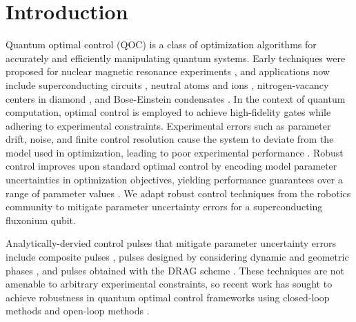 \section{Introduction}
Quantum optimal control (QOC) is a class of optimization
algorithms for accurately and efficiently manipulating quantum systems.
Early techniques were proposed for nuclear magnetic resonance experiments
\cite{vandersypen2005nmr, kehlet2004improving, khaneja2005optimal,
  maximov2008optimal, nielsen2010optimal, skinner2003application, tosner2009optimal},
and applications now include superconducting circuits \cite{abdelhafez2020universal,
  chakram2020multimode, fisher2010optimal, gokhale2019partial,
  leng2019robust, leung2017speedup, li2020fast},
neutral atoms and ions \cite{brouzos2015quantum,
  de2008optimal, goerz2011quantum, guo2019high, jensen2019time,
  larrouy2020fast, omran2019generation, rosi2013fast, sorensen2019qengine,
  treutlein2006microwave, van2016optimal},
nitrogen-vacancy centers in diamond \cite{chou2015optimal,
  dolde2014high, geng2016experimental,
  nobauer2015smooth, poggiali2018optimal, rembold2020introduction, tian2019optimal},
and Bose-Einstein condensates \cite{amri2019optimal, sorensen2018quantum}.
In the context of quantum computation,
optimal control is employed to achieve high-fidelity gates
while adhering to experimental constraints.
Experimental errors such as parameter drift, noise, and
finite control resolution cause the system to deviate
from the model used in optimization, leading
to poor experimental performance
.
Robust control improves upon
standard optimal control by encoding
model parameter uncertainties
in optimization objectives, yielding performance
guarantees over a range of parameter values \cite{Zhou97,Morimoto00,Manchester18}.
We adapt robust control techniques from the robotics community to mitigate
parameter uncertainty errors for
a superconducting fluxonium qubit.

Analytically-dervied control pulses that mitigate parameter uncertainty
errors include composite pulses \cite{cummins2000use, cummins2003tackling,
  kupce1995stretched, merrill2014progress},
pulses designed by considering dynamic and geometric phases
\cite{han2020experimental, xu2020nonadiabatic}, and
pulses obtained with the DRAG scheme \cite{motzoi2009simple}.
These techniques are not amenable to arbitrary experimental constraints,
so recent work has sought to achieve robustness in quantum optimal
control frameworks using closed-loop methods \cite{egger2014adaptive, feng2018gradient,
  li2017hybrid, wittler2020integrated} and open-loop methods \cite{
  allen2019robust, carvalho2020error, reinhold2019controlling,
  rembold2020introduction, kosut2013robust, niu2019universal}.

